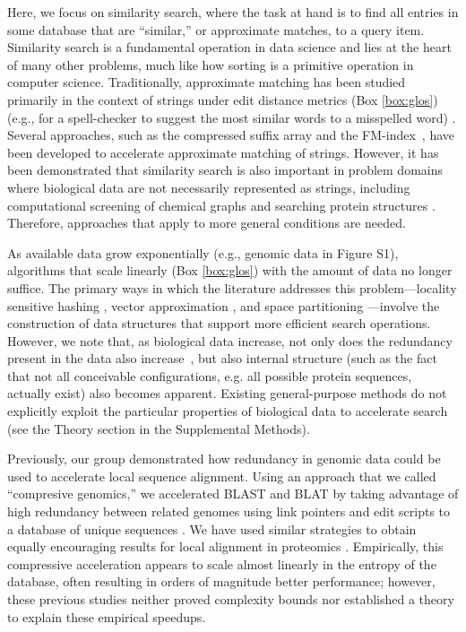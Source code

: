 \documentclass[11pt]{elsarticle}
\renewcommand{\cite}{\citep} %
\theoremstyle{definition}
\theoremstyle{remark}
\numberwithin{equation}{section}
\begin{document}
Here, we focus on similarity search, where the task at hand is to find all entries in some database that are ``similar,'' or approximate matches, to a query item.
Similarity search is a fundamental operation in data science and lies at the heart of many other problems, much like how sorting is a primitive operation in computer science.
Traditionally, approximate matching has been studied primarily in the context of strings under edit distance metrics (Box \ref{box:glos}) (e.g., for a spell-checker to suggest the most similar words to a misspelled word) \cite{ukkonen1985algorithms}.
Several approaches, such as the compressed suffix array and the FM-index~\cite{grossi2005compressed, ferragina2000opportunistic}, have been developed to accelerate approximate matching of strings.
However, it has been demonstrated that similarity search is also important in problem domains where biological data are not necessarily represented as strings, including computational screening of chemical graphs \cite{schaeffer2007graph} and searching protein structures \cite{budowski2010fragbag}.
Therefore, approaches that apply to more general conditions are needed.

As available data grow exponentially \cite{berger2013computational,yu2015quality} (e.g., genomic data in Figure S1), 
algorithms that scale linearly (Box \ref{box:glos}) with the amount of data no longer suffice.
The primary ways in which the literature addresses this problem---locality sensitive 
hashing \cite{indyk1998approximate}, vector approximation 
\cite{ferhatosmanoglu2000vector}, and space partitioning 
\cite{weber1998quantitative}---involve the construction of data structures that support more efficient search operations.
However, we note that, as biological data increase, not only does the redundancy present in the data also increase~\cite{loh2012compressive}, but also
internal structure (such as the fact that not all conceivable configurations, e.g. all possible protein sequences, actually exist) also becomes apparent.
Existing general-purpose methods do not explicitly exploit the particular 
properties of biological data to accelerate search (see the Theory section in the Supplemental Methods).

Previously, our group demonstrated how redundancy in genomic data could be used to accelerate local sequence alignment.
Using an approach that we called ``compresive genomics,'' we accelerated BLAST and BLAT \cite{kent2002blat} by taking advantage of high redundancy between related genomes using link pointers and edit scripts to a database of unique sequences \cite{loh2012compressive}.
We have used similar strategies to obtain equally encouraging results for local alignment in proteomics \cite{daniels2013compressive}.
Empirically, this compressive acceleration appears to scale almost linearly in the entropy of the database, often resulting in orders of magnitude better performance;
however, these previous studies neither proved complexity bounds nor established a theory to explain these empirical speedups.
\end{document}
